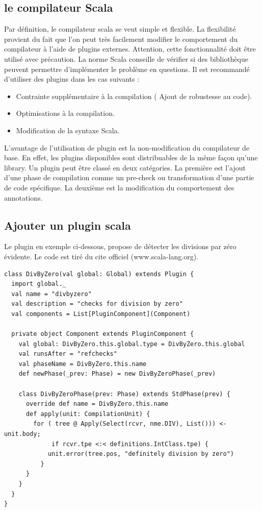 \documentclass[a4paper,11pt]{report}
\begin{document}
{{\subsection{le compilateur Scala}
\normalsize{
Par définition, le compilateur scala se veut simple et flexible. La flexibilité provient du fait que l'on peut très facilement modifier le comportement du compilateur à l'aide de plugins externes. Attention, cette fonctionnalité doit être utilisé avec précaution. La norme Scala conseille de vérifier si des bibliothèque peuvent permettre d'implémenter le problème en questions. Il est recommandé d'utiliser des plugins dans les cas suivants :
} 
\begin{itemize}
\item Contrainte supplémentaire à la compilation ( Ajout de robustesse au code).
\item Optimisations à la compilation.
\item Modification de la syntaxe Scala.
\end{itemize}
\vspace{6mm}
\normalsize{

	L'avantage de l'utilisation de plugin est la non-modification du compilateur de base. En effet, les plugins disponibles sont distribuables de la même façon qu'une library. Un plugin peut être classé en deux catégories. La première est l'ajout d'une phase de compilation comme un pre-check ou transformation d'une partie de code spécifique. La deuxième est la modification du comportement des annotations. 
}

\subsection{Ajouter un plugin scala}
\normalsize{
Le plugin en exemple ci-dessous, propose de détecter les divisions par zéro évidente. Le code est tiré du cite officiel (www.scala-lang.org).
}

\begin{lstlisting}
class DivByZero(val global: Global) extends Plugin {
  import global._
  val name = "divbyzero"
  val description = "checks for division by zero"
  val components = List[PluginComponent](Component)
  
  private object Component extends PluginComponent {
    val global: DivByZero.this.global.type = DivByZero.this.global
    val runsAfter = "refchecks"
    val phaseName = DivByZero.this.name
    def newPhase(_prev: Phase) = new DivByZeroPhase(_prev)    
    
    class DivByZeroPhase(prev: Phase) extends StdPhase(prev) {
      override def name = DivByZero.this.name
      def apply(unit: CompilationUnit) {
        for ( tree @ Apply(Select(rcvr, nme.DIV), List())) <- unit.body;
             if rcvr.tpe <:< definitions.IntClass.tpe) {
            unit.error(tree.pos, "definitely division by zero")
          }
      }
    }
  }
}
\end{lstlisting}

}}
\end{document}

